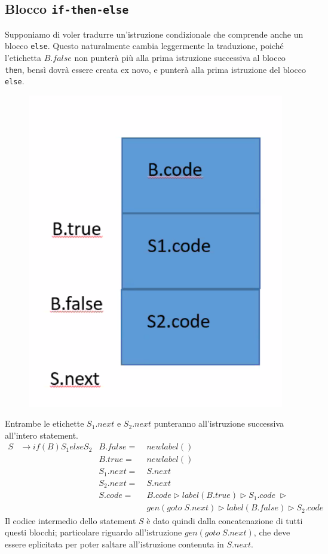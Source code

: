 \documentclass[class=book, crop=false, oneside, 12pt]{standalone}
\begin{document}
\subsection{Blocco \texttt{if-then-else}}
Supponiamo di voler tradurre un'istruzione condizionale che comprende anche un blocco \texttt{else}. Questo naturalmente cambia leggermente la traduzione, poiché l'etichetta \(B.false\) non punterà più alla prima istruzione successiva al blocco \texttt{then}, bensì dovrà essere creata ex novo, e punterà alla prima istruzione del blocco \texttt{else}.
\begin{figure}[H]
    \centering
    \includegraphics[width=.4\textwidth]{if-else-trans.png}
    \caption{}
    \label{}
\end{figure}
Entrambe le etichette \(S_1.next\) e \(S_2.next\) punteranno all'istruzione successiva all'intero statement.
\begin{align*}
    S &\to if (B) S_1 else S_2 & B.false =\; &newlabel() \\
    & & B.true =\; &newlabel() \\
    & & S_1.next =\; &S.next \\
    & & S_2.next =\; &S.next \\
    & & S.code =\; &B.code \triangleright label(B.true) \triangleright S_1.code\; \triangleright \\
    & & &gen(goto\; S.next) \triangleright label(B.false) \triangleright S_2.code
\end{align*}
Il codice intermedio dello statement \(S\) è dato quindi dalla concatenazione di tutti questi blocchi; particolare riguardo all'istruzione \(gen(goto\; S.next)\), che deve essere eplicitata per poter saltare all'istruzione contenuta in \(S.next\).
\end{document}
